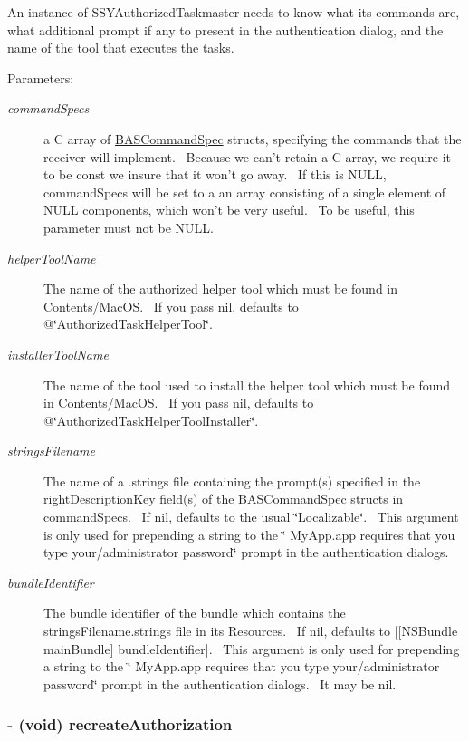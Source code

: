 An instance of SSYAuthorizedTaskmaster needs to know what its commands are, what additional prompt if any to present in the authentication dialog, and the name of the tool that executes the tasks. \begin{Desc}
\item[Parameters:]
\begin{description}
\item[{\em commandSpecs}]a C array of \hyperlink{struct_b_a_s_command_spec}{BASCommandSpec} structs, specifying the commands that the receiver will implement.~ Because we can't retain a C array, we require it to be const we insure that it won't go away.~ If this is NULL, commandSpecs will be set to a an array consisting of a single element of NULL components, which won't be very useful.~ To be useful, this parameter must not be NULL. \item[{\em helperToolName}]The name of the authorized helper tool which must be found in Contents/MacOS.~ If you pass nil, defaults to @\char`\"{}AuthorizedTaskHelperTool\char`\"{}. \item[{\em installerToolName}]The name of the tool used to install the helper tool which must be found in Contents/MacOS.~ If you pass nil, defaults to @\char`\"{}AuthorizedTaskHelperToolInstaller\char`\"{}. \item[{\em stringsFilename}]The name of a .strings file containing the prompt(s) specified in the rightDescriptionKey field(s) of the \hyperlink{struct_b_a_s_command_spec}{BASCommandSpec} structs in commandSpecs.~ If nil, defaults to the usual \char`\"{}Localizable\char`\"{}.~ This argument is only used for prepending a string to the \char`\"{} MyApp.app requires that you type your/administrator password\char`\"{} prompt in the authentication dialogs. \item[{\em bundleIdentifier}]The bundle identifier of the bundle which contains the stringsFilename.strings file in its Resources.~ If nil, defaults to \mbox{[}\mbox{[}NSBundle mainBundle\mbox{]} bundleIdentifier\mbox{]}.~ This argument is only used for prepending a string to the \char`\"{} MyApp.app requires that you type your/administrator password\char`\"{} prompt in the authentication dialogs.~ It may be nil. \end{description}
\end{Desc}
\hypertarget{class_s_s_y_authorized_task_master_9d441761cf1e564a0c96c7ddf6f58837}{
\subsubsection[{recreateAuthorization}]{\setlength{\rightskip}{0pt plus 5cm}- (void) recreateAuthorization }}
\label{class_s_s_y_authorized_task_master_9d441761cf1e564a0c96c7ddf6f58837}


